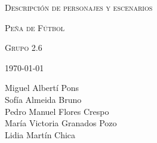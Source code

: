 \documentclass[11pt]{article}
\begin{document}
\begin{titlepage}
\centering
\vspace{4.5cm}
{\scshape\LARGE Descripción de personajes y escenarios\par}
{\scshape\LARGE Peña de Fútbol\par}
{\scshape\Large Grupo 2.6\par}
\vspace{1.5cm}

{\scshape\large \today \par}
\vspace{14cm}

{Miguel Albertí Pons\\
Sofía Almeida Bruno\\
Pedro Manuel Flores Crespo\\
María Victoria Granados Pozo\\
Lidia Martín Chica
\par}

\end{titlepage}


\newpage
\end{document}
